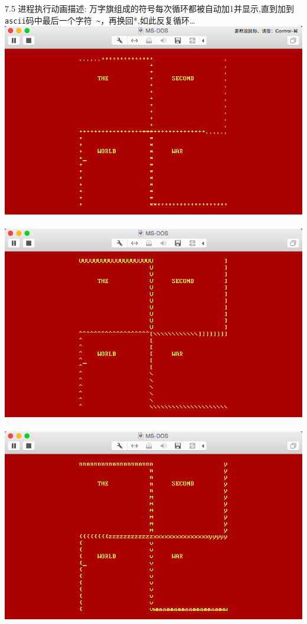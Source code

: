 \documentclass[a4paper]{article}
\begin{document}
{{7.5 进程执行动画描述: 万字旗组成的符号每次循环都被自动加1并显示,直到加到\verb| ascii|码中最后一个字符\verb| ~|，再换回*,如此反复循环\ldots
{\center\includegraphics[scale=0.45]{Illustrations/process_1.png}}\\\\
{\center\includegraphics[scale=0.45]{Illustrations/process_2.png}}\\\\
{\center\includegraphics[scale=0.45]{Illustrations/process_3.png}}\\\\
}}
\end{document}
